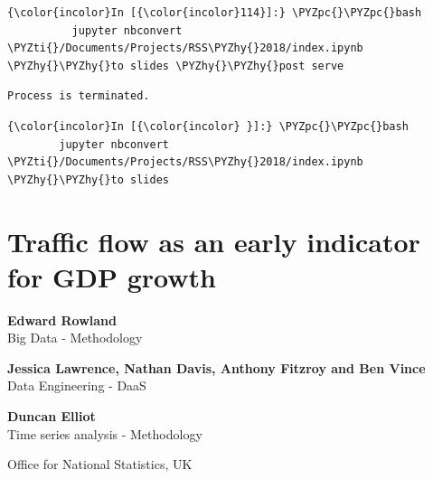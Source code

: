 \documentclass[11pt]{article}
\def\PYZpc{\char`\%}
\def\PYZhy{\char`\-}
\def\PYZti{\char`\~}
\begin{document}
    \begin{Verbatim}[commandchars=\\\{\}]
{\color{incolor}In [{\color{incolor}114}]:} \PYZpc{}\PYZpc{}bash 
          jupyter nbconvert \PYZti{}/Documents/Projects/RSS\PYZhy{}2018/index.ipynb \PYZhy{}\PYZhy{}to slides \PYZhy{}\PYZhy{}post serve
\end{Verbatim}


    \begin{Verbatim}[commandchars=\\\{\}]
Process is terminated.

    \end{Verbatim}

    \begin{Verbatim}[commandchars=\\\{\}]
{\color{incolor}In [{\color{incolor} }]:} \PYZpc{}\PYZpc{}bash 
        jupyter nbconvert \PYZti{}/Documents/Projects/RSS\PYZhy{}2018/index.ipynb \PYZhy{}\PYZhy{}to slides
\end{Verbatim}


    \section{Traffic flow as an early indicator for GDP
growth}\label{traffic-flow-as-an-early-indicator-for-gdp-growth}

\textbf{Edward Rowland}\\
Big Data - Methodology

\textbf{Jessica Lawrence, Nathan Davis, Anthony Fitzroy and Ben Vince}\\
Data Engineering - DaaS

\textbf{Duncan Elliot}\\
Time series analysis - Methodology

Office for National Statistics, UK
\end{document}

